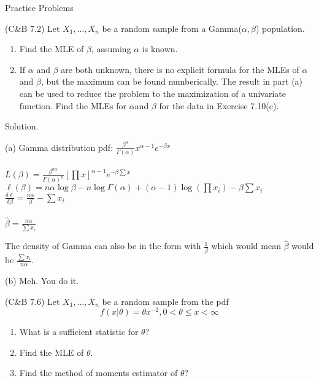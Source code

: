 \documentclass[11pt,fleqn]{book} %
\begin{document}
\begin{section}{Practice Problems}

	\begin{problem} (C\&B 7.2) Let $X_1, \dots, X_n$ be a random sample from a Gamma($\alpha, \beta$) population.

		\begin{enumerate}[label=(\alph*)] 
			\item Find the MLE of $\beta$, assuming $\alpha$ is known.
			\item If $\alpha$ and $\beta$ are both unknown, there is no explicit formula for the MLEs of $\alpha$ and $\beta$, but the maximum can be found numberically. The result in part (a) can be used to reduce the problem to the maximization of a univariate function. Find the MLEs for $\alpha$and $\beta$ for the data in Exercise 7.10(c).
		\end{enumerate}

			Solution.

			(a) Gamma distribution pdf: $\frac{\beta^\alpha}{\Gamma(\alpha)}x^{\alpha-1}e^{-\beta x}$\\
			\\
			$L(\beta) = \frac{\beta^{n\alpha}}{\Gamma(\alpha)^n}[\prod x]^{\alpha-1}e^{-\beta \sum x}$\\

			$\ell(\beta) = n\alpha\log\beta - n\log\Gamma(\alpha) +(\alpha-1)\log(\prod x_i) - \beta \sum x_i $\\

			$\frac{\delta \ell}{\delta \beta} = \frac{n\alpha}{\beta} - \sum x_i$\\
			\\
			$\hat{\beta} = \frac{n\alpha}{\sum x_i}$

			\begin{remark}
				The density of Gamma can also be in the form with $\frac{1}{\beta}$ which would mean $\hat{\beta}$ would be $\frac{\sum x_i}{n\alpha} $.
			\end{remark} 

			(b) Meh. You do it. 

	\end{problem}
	
	\begin{problem} (C\&B 7.6) Let $X_1, \dots, X_n$ be a random sample from the pdf
	$$f(x|\theta) = \theta x^{-2}, 0<\theta\le x < \infty $$

	\begin{enumerate}[label=(\alph*)]
		\item What is a sufficient statistic for $\theta$?
		\item Find the MLE of $\theta$.
		\item Find the method of moments estimator of $\theta$?
	\end{enumerate}
		


\end{problem}
\end{section}
\end{document}
